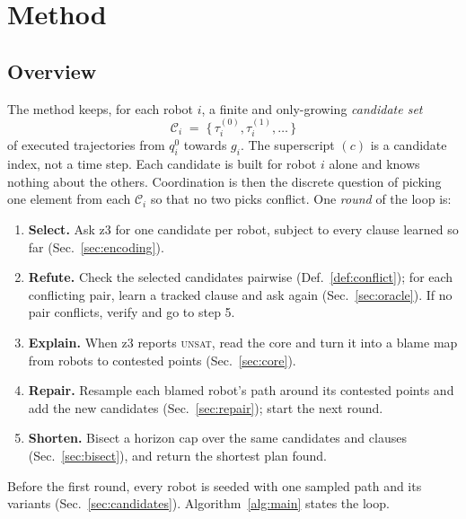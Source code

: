 \documentclass[conference]{IEEEtran}
\theoremstyle{plain}
\theoremstyle{definition}
\newcommand{\Cand}{\mathcal{C}}
\begin{document}
\section{Method}
\label{sec:method}

\subsection{Overview}

The method keeps, for each robot $i$, a finite and only-growing \emph{candidate set}
\[
  \Cand_i \;=\; \{\,\tau_i^{(0)}, \tau_i^{(1)}, \dots\,\}
\]
of executed trajectories from $q_i^0$ towards $g_i$. The superscript $(c)$ is a candidate
index, not a time step. Each candidate is built for robot $i$ alone and knows nothing about
the others. Coordination is then the discrete question of picking one element from each
$\Cand_i$ so that no two picks conflict. One \emph{round} of the loop is:

\begin{enumerate}
  \item \textbf{Select.} Ask z3 for one candidate per robot, subject to every clause learned
        so far (Sec.~\ref{sec:encoding}).
  \item \textbf{Refute.} Check the selected candidates pairwise (Def.~\ref{def:conflict});
        for each conflicting pair, learn a tracked clause and ask again
        (Sec.~\ref{sec:oracle}). If no pair conflicts, verify and go to step 5.
  \item \textbf{Explain.} When z3 reports \textsc{unsat}, read the core and turn it into a
        blame map from robots to contested points (Sec.~\ref{sec:core}).
  \item \textbf{Repair.} Resample each blamed robot's path around its contested points and
        add the new candidates (Sec.~\ref{sec:repair}); start the next round.
  \item \textbf{Shorten.} Bisect a horizon cap over the same candidates and clauses
        (Sec.~\ref{sec:bisect}), and return the shortest plan found.
\end{enumerate}
Before the first round, every robot is seeded with one sampled path and its variants
(Sec.~\ref{sec:candidates}). Algorithm~\ref{alg:main} states the loop.
\end{document}
